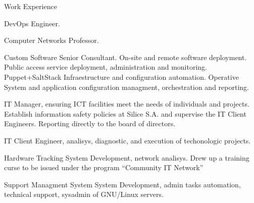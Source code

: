\begin{rubric}{Work Experience}

 DevOps Engineer. 

 Computer Networks Professor. 

 Custom Software Senior Consultant. On-site
	and remote software deployment. Public access service deployment, administration and monitoring. 
	Puppet+SaltStack Infraestructure and configuration automation. Operative System and application 
	configuration managment, orchestration and reporting.

 IT Manager, ensuring ICT facilities meet the needs of 
	individuals and projects. Establish information safety policies at Silice S.A. and supervise 
	the IT Client Engineers. Reporting directly to the board of directors.

 IT Client Engineer, analisys, diagnostic, and execution of techonologic projects.

 Hardware Tracking System Development, network analisys. Drew up
	a training curse to be issued under the program ``Community IT Network''

 Support Managment System System Development,  
	admin tasks automation, technical support, sysadmin of GNU/Linux servers.
\end{rubric}

